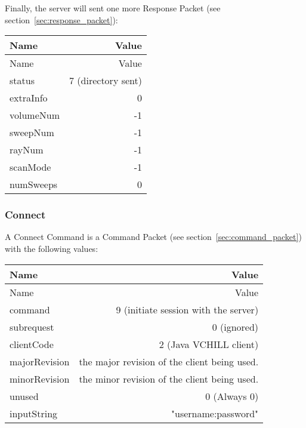 \documentclass[10pt]{article}
\newcommand{\tblspc}{\rule{0pt}{3ex}}
\begin{document}
Finally, the server will sent one more Response Packet (see section~\ref{sec:response_packet}):
\begin{longtable}{|l|r|}
\hline Name & Value \\ \hline \endfirsthead
\hline Name & Value \\ \hline \endhead
\hline \endfoot
\tblspc status & 7 (directory sent) \\
\hline
\tblspc extraInfo & 0 \\
\hline
\tblspc volumeNum & -1 \\
\hline
\tblspc sweepNum & -1 \\
\hline
\tblspc rayNum & -1 \\
\hline
\tblspc scanMode & -1 \\
\hline
\tblspc numSweeps & 0 \\
\hline
\end{longtable}
\newpage

\subsubsection{Connect}
\label{sec:connect}
A Connect Command is a Command Packet (see section~\ref{sec:command_packet}) with the following values:
\begin{longtable}{|l|r|}
\hline Name & Value \\ \hline \endfirsthead
\hline Name & Value \\ \hline \endhead
\hline \endfoot
\tblspc command & 9 (initiate session with the server) \\
\hline
\tblspc subrequest & 0 (ignored) \\
\hline
\tblspc clientCode & 2 (Java VCHILL client) \\
\hline
\tblspc majorRevision & the major revision of the client being used. \\
\hline
\tblspc minorRevision & the minor revision of the client being used. \\
\hline
\tblspc unused & 0 (Always 0) \\
\hline
\tblspc inputString & "username:password" \\
\hline
\end{longtable}
\end{document}
